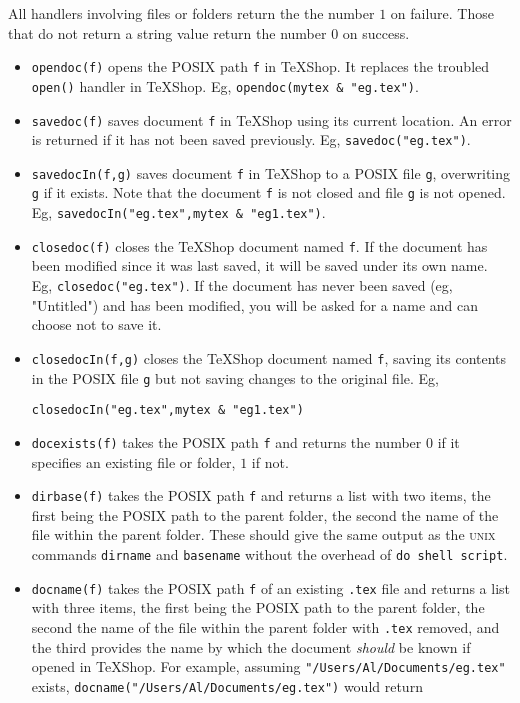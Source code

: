 \documentclass[11pt]{amsart}
\def\UNIX{\textsc{unix}\xspace}
\begin{document}
All handlers involving files or folders return the the number $1$ on failure. Those that do not return a string value return the number $0$ on success.
\begin{itemize}
\item
{\tt opendoc(f)} opens the POSIX path {\tt f} in TeXShop. It replaces the troubled {\tt open()} handler in TeXShop. Eg, \verb|opendoc(mytex & "eg.tex")|.
\item {\tt savedoc(f)} saves document {\tt f} in TeXShop using its current location. An error is returned if it has not been saved previously. Eg, \verb|savedoc("eg.tex")|.
\item {\tt savedocIn(f,g)} saves document {\tt f} in TeXShop to a POSIX file {\tt g}, overwriting {\tt g} if it exists. Note that the document {\tt f} is not closed and file {\tt g} is not opened. Eg, \verb|savedocIn("eg.tex",mytex & "eg1.tex")|.
\item {\tt closedoc(f)} closes the TeXShop document named {\tt f}. If the document has been modified since it was last saved, it will be saved under its own name. Eg, \verb|closedoc("eg.tex")|. If the document has never been saved (eg, "Untitled") and has been modified, you will be asked for a name and can choose not to save it.
\item {\tt closedocIn(f,g)} closes the TeXShop document named {\tt f}, saving its contents in the POSIX file {\tt g} but not saving changes to the original file. Eg, 
\begin{verbatim}
closedocIn("eg.tex",mytex & "eg1.tex")
\end{verbatim}
\item {\tt docexists(f)} takes the POSIX path {\tt f} and returns the number $0$ if it specifies an existing  file or folder, $1$ if not. 
\item {\tt dirbase(f)} takes the POSIX path {\tt f} and returns a list with two items, the first being the POSIX path to the parent folder, the second the name of the file within the parent folder. These should give the same output as the \UNIX commands {\tt dirname} and {\tt basename} without the overhead of {\tt do shell script}.
\item {\tt docname(f)} takes the POSIX path {\tt f} of an existing  {\tt.tex} file and returns a list with three items, the first being the POSIX path to the parent folder, the second the name of the file within the parent folder with {\tt.tex} removed, and the third provides the name by which the document \emph{should} be known if opened in TeXShop. For example, assuming \verb|"/Users/Al/Documents/eg.tex"| exists, \verb|docname("/Users/Al/Documents/eg.tex")| would return 

\end{itemize}
\end{document}
